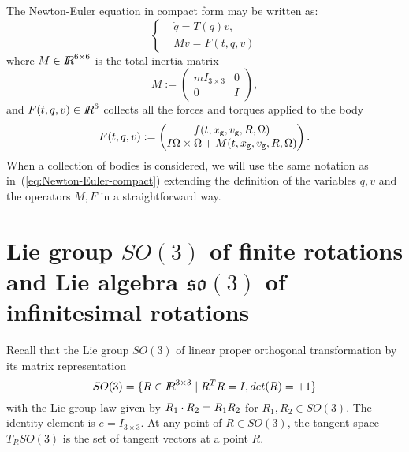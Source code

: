 %
The Newton-Euler equation in compact form may be written as:
\begin{equation}
\label{eq:Newton-Euler-compact}
\boxed{ \left \{ 
 \begin{aligned}
  &\dot q=T(q)v, \\
  & M \dot v = F(t, q, v)
 \end{aligned}
 \right.}
\end{equation}
where $M\in\mbox{\rm $I\!\!R$}^{6\times6}$ is the total inertia matrix
\begin{equation}
  M:= \begin{pmatrix}
    m I_{3\times 3} & 0 \\
    0 & I 
  \end{pmatrix},
\end{equation}
and $F(t, q, v)\in \mbox{\rm $I\!\!R$}^6$ collects all the forces and torques applied to the body
\begin{equation}
  F(t,q,v):= \begin{pmatrix}
    f(t,x_{\sf \small g},  v_{\sf \small g}, R, \Omega ) \\
    I \Omega \times \Omega + M(t,x_{\sf \small g}, v_{\sf \small g}, R, \Omega )
  \end{pmatrix}.
\end{equation}
When a collection of bodies is considered, we will use the same notation as in~(\ref{eq:Newton-Euler-compact}) extending the definition of the variables $q,v$ and the operators $M,F$ in a straightforward way.





\section{ Lie group $SO(3)$ of finite rotations and Lie algebra $\mathfrak{so}(3)$ of infinitesimal rotations}

Recall that the Lie group $SO(3)$ of linear proper orthogonal transformation by its matrix representation
\begin{equation}
  \label{eq:47}
  SO(3) = \{R \in \mbox{\rm $I\!\!R$}^{3\times3}\mid R^TR=I , det(R) = +1  \}
\end{equation}
with the Lie group law given by $R_1\cdot R_2 = R_1R_2$ for $R_1,R_2\in SO(3)$. The identity element is $e = I_{3\times 3}$. At any point of $R\in SO(3)$, the tangent space $T_RSO(3)$ is the set of tangent vectors at a point $R$.

